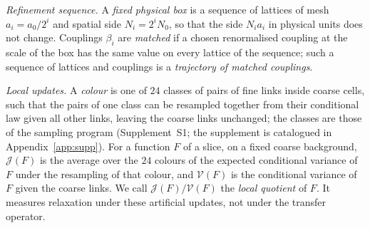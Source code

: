 \emph{Refinement sequence.} A \emph{fixed physical box} is a sequence of lattices of mesh $a_i=a_0/2^i$ and
spatial side $N_i=2^iN_0$, so that the side $N_ia_i$ in physical units does not change. Couplings $\beta_i$ are
\emph{matched} if a chosen renormalised coupling at the scale of the box has the same value on every lattice
of the sequence; such a sequence of lattices and couplings is a \emph{trajectory of matched couplings}.

\emph{Local updates.} A \emph{colour} is one of $24$ classes of pairs of fine links inside coarse cells, such
that the pairs of one class can be resampled together from their conditional law given all other links,
leaving the coarse links unchanged; the classes are those of the sampling program (Supplement~S1; the
supplement is catalogued in Appendix~\ref{app:supp}). For a function $F$ of a slice, on a fixed coarse background, $\mathcal J(F)$ is the average over the $24$ colours of the
expected conditional variance of $F$ under the resampling of that colour, and $\mathcal V(F)$ is the
conditional variance of $F$ given the coarse links. We call $\mathcal J(F)/\mathcal V(F)$ the \emph{local
quotient} of $F$. It measures relaxation under these artificial updates, not under the transfer operator.

